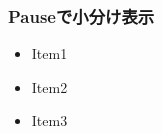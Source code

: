 \documentclass[dvipdfmx, 14pt]{beamer}
\begin{document}
\begin{frame}
  \frametitle{Pauseで小分け表示}
  \begin{itemize}
    \item Item1
    \pause
    \item Item2
    \pause
    \item Item3
  \end{itemize}
\end{frame}
\end{document}
